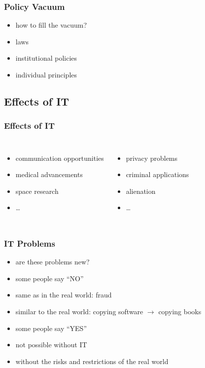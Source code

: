 \documentclass[dvipsnames]{beamer}
\begin{document}
\begin{frame}
  \frametitle{Policy Vacuum}

  \begin{itemize}
    \item how to fill the vacuum?

    \bigskip
    \item laws
    \item institutional policies
    \item individual principles
  \end{itemize}
\end{frame}

\subsection{Effects of IT}

\begin{frame}
  \frametitle{Effects of IT}

  \begin{columns}
    \begin{itemize}
      \item communication opportunities
      \item medical advancements
      \item space research
      \item \ldots
    \end{itemize}

    \pause
    \begin{itemize}
      \item privacy problems
      \item criminal applications
      \item alienation
      \item \ldots
    \end{itemize}
  \end{columns}
\end{frame}

\begin{frame}
  \frametitle{IT Problems}

  \begin{itemize}
    \item are these problems new?
  \end{itemize}

  \begin{itemize}
    \item some people say ``NO''
    \item same as in the real world: fraud
    \item similar to the real world:
      copying software $\rightarrow$ copying books

    \pause
    \medskip
    \item some people say ``YES''
    \item not possible without IT
    \item without the risks and restrictions of the real world
  \end{itemize}
\end{frame}
\end{document}
